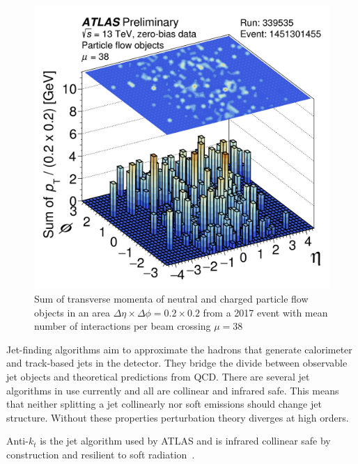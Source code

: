 \begin{figure}[!h]
        \centering
    \includegraphics[width=.4\textwidth]{Pictures/ParticleFlowExample.png}
    \caption{Sum of transverse momenta of neutral and charged particle flow objects in an area $\Delta \eta \times \Delta\phi = 0.2 \times 0.2$ from a 2017 event with mean number of interactions per beam crossing $\mu=38$~\cite{JETEtmiss}}
    \label{fig:ParticleFlowExample}
\end{figure}

Jet-finding algorithms aim to approximate the hadrons that generate calorimeter and track-based jets in the detector. They bridge the divide between observable jet objects and theoretical predictions from QCD. There are several jet algorithms in use currently and all are collinear and infrared safe. This means that neither splitting a jet collinearly nor soft emissions should change jet structure. Without these properties perturbation theory diverges at high orders.

Anti-$k_t$ is the jet algorithm used by ATLAS and is infrared collinear safe by construction and resilient to soft radiation~\cite{antikt}.

